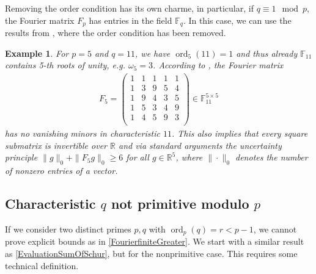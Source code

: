 \documentclass[a4paper]{article}
\newcommand{\R}{\ensuremath{\mathbb{R}}}
\newcommand{\F}{\mathbb{F}}
\newcommand{\ord}{\operatorname{ord}}
\newtheorem{example}[theorem]{Example}
\numberwithin{equation}{section}
\numberwithin{table}{section}
\numberwithin{figure}{section}
\begin{document}
Removing the order condition has its own charme, in particular, if $q \equiv 1 \mod p$, the Fourier matrix $F_p$ has entries in the field $\F_q$. In this case, we can use the results from \cite{PfCaLeMa25}, where the order condition has been removed.
\begin{example}\label{ex:F5}
 For $p=5$ and $q=11$, we have $\ord_5(11)=1$ and thus already $\F_{11}$ contains 5-th roots of unity, e.g. $\omega_5=3$.
 According to \cite{PfCaLeMa25}, the Fourier matrix 
 \begin{align*}
 F_5=
 \left(
\begin{array}{ccccc}
1 & 1 & 1 & 1 & 1 \\
1 & 3 & 9 & 5 & 4 \\
1 & 9 & 4 & 3 & 5 \\
1 & 5 & 3 & 4 & 9 \\
1 & 4 & 5 & 9 & 3 \\
\end{array}
\right)\in\F_{11}^{5\times 5}
 \end{align*}
 has no vanishing minors in characteristic $11$. This also implies that every square submatrix is invertible over $\R$ and via standard arguments \cite{Tao} the uncertainty principle
   $  \|g\|_0 + \|F_5 g\|_0\ge 6$
 for all $g\in\R^5$, where $\|\cdot\|_0$ denotes the number of nonzero entries of a vector.
\end{example}


\subsection{Characteristic $q$ not primitive modulo $p$}

If we consider two distinct primes $p,q$ with $\ord_p(q)=r<p-1$, we cannot prove explicit bounds as in \cref{FourierfiniteGreater}. We start with a similar result as \cref{EvaluationSumOfSchur}, but for the nonprimitive case. This requires some technical definition.
\end{document}

